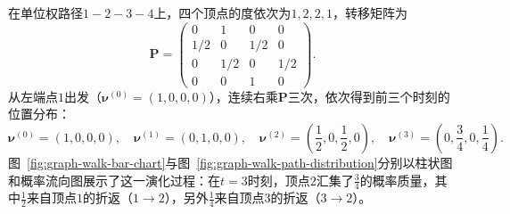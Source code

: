在单位权路径$1\!-\!2\!-\!3\!-\!4$上，四个顶点的度依次为$1,2,2,1$，转移矩阵为
\[
\bm{P}=\begin{pmatrix}
0&1&0&0\\
1/2&0&1/2&0\\
0&1/2&0&1/2\\
0&0&1&0
\end{pmatrix}.
\]
从左端点$1$出发（$\bm\nu^{(0)}=(1,0,0,0)$），连续右乘$\bm P$三次，依次得到前三个时刻的位置分布：
\[
\bm{\nu}^{(0)}=(1,0,0,0),\quad
\bm{\nu}^{(1)}=(0,1,0,0),\quad
\bm{\nu}^{(2)}=\left(\frac12,0,\frac12,0\right),\quad
\bm{\nu}^{(3)}=\left(0,\frac34,0,\frac14\right).
\]
图~\ref{fig:graph-walk-bar-chart}与图~\ref{fig:graph-walk-path-distribution}分别以柱状图和概率流向图展示了这一演化过程：在$t=3$时刻，顶点$2$汇集了$\frac34$的概率质量，其中$\frac12$来自顶点$1$的折返（$1\to 2$），另外$\frac14$来自顶点$3$的折返（$3\to 2$）。

